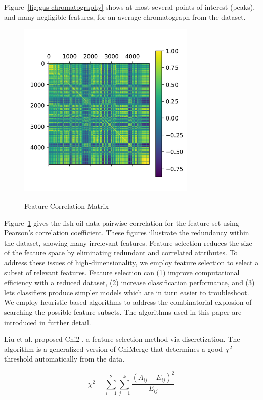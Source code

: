 \documentclass[runningheads]{llncs}
\begin{document}
Figure~\ref{fig:gas-chromatography} shows at most several points of interest (peaks), and many negligible features, for an average chromatograph from the dataset. 

\begin{figure}[htb]
  \centering
  \caption{Feature Correlation Matrix}
  \includegraphics[width=8.5cm]{fish_correlation_matrix.png}
  \label{fig:correlation-matrix} 
  \captionsetup[figure]{font=small,labelfont=small}
\end{figure}

Figure~\ref{fig:correlation-matrix} gives the fish oil data pairwise correlation for the feature set using Pearson's correlation coefficient.
These figures illustrate the redundancy within the dataset, showing many irrelevant features. 
Feature selection reduces the size of the feature space by eliminating redundant and correlated attributes. 
To address these issues of high-dimensionality, we employ feature selection to select a subset of relevant features. 
Feature selection can (1) improve computational efficiency with a reduced dataset, (2) increase classification performance, and (3) lets classifiers produce simpler models which are in turn easier to troubleshoot.
We employ heuristic-based algorithms to address the combinatorial explosion of searching the possible feature subsets.
The algorithms used in this paper are introduced in further detail.

Liu et al. proposed Chi2 \cite{liu1995chi2}, a feature selection method via discretization. 
The algorithm is a generalized version of ChiMerge \cite{kerber1992chimerge} that determines a good $\chi^2$ threshold automatically from the data.

\begin{equation}
  \chi^2 = \sum_{i=1}^2 \sum_{j=1}^k \frac{(A_{ij} - E_{ij})^2}{E_{ij}}
  \label{eq:chi}
\end{equation}
\end{document}

